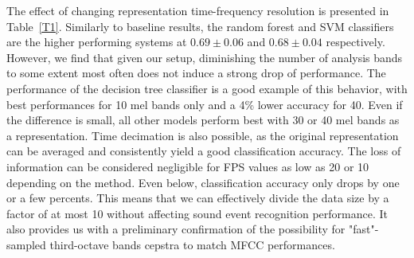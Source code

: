 \documentclass[final,3p,times,twocolumn]{elsarticle}
\begin{document}
The effect of changing representation time-frequency resolution is presented in Table~\ref{T1}. Similarly to baseline results, the random forest and SVM classifiers are the higher performing systems at $0.69\pm 0.06$ and $0.68\pm 0.04$ respectively. However, we find that given our setup, diminishing the number of analysis bands to some extent most often does not induce a strong drop of performance. The performance of the decision tree classifier is a good example of this behavior, with best performances for 10 mel bands only and a 4\% lower accuracy for 40. Even if the difference is small, all other models perform best with 30 or 40 mel bands as a representation. Time decimation is also possible, as the original representation can be averaged and consistently yield a good classification accuracy. The loss of information can be considered negligible for FPS values as low as 20 or 10 depending on the method. Even below, classification accuracy only drops by one or a few percents. This means that we can effectively divide the data size by a factor of at most 10 without affecting sound event recognition performance. It also provides us with a preliminary confirmation of the possibility for "fast"-sampled third-octave bands cepstra to match  MFCC performances.\\
\end{document}
